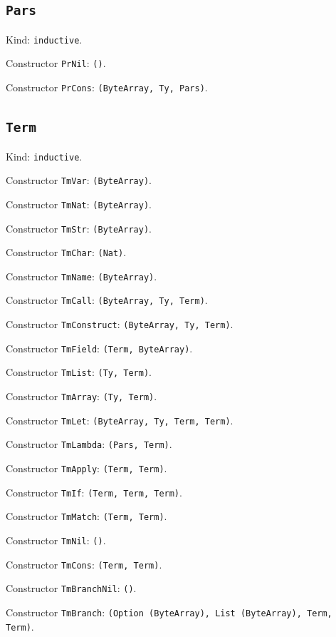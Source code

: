\documentclass[11pt]{article}
\begin{document}
\subsection*{\texttt{Pars}}
\noindent Kind: \texttt{inductive}.\par
\noindent Constructor \texttt{PrNil}: \texttt{()}.\par
\noindent Constructor \texttt{PrCons}: \texttt{(ByteArray, Ty, Pars)}.\par
\subsection*{\texttt{Term}}
\noindent Kind: \texttt{inductive}.\par
\noindent Constructor \texttt{TmVar}: \texttt{(ByteArray)}.\par
\noindent Constructor \texttt{TmNat}: \texttt{(ByteArray)}.\par
\noindent Constructor \texttt{TmStr}: \texttt{(ByteArray)}.\par
\noindent Constructor \texttt{TmChar}: \texttt{(Nat)}.\par
\noindent Constructor \texttt{TmName}: \texttt{(ByteArray)}.\par
\noindent Constructor \texttt{TmCall}: \texttt{(ByteArray, Ty, Term)}.\par
\noindent Constructor \texttt{TmConstruct}: \texttt{(ByteArray, Ty, Term)}.\par
\noindent Constructor \texttt{TmField}: \texttt{(Term, ByteArray)}.\par
\noindent Constructor \texttt{TmList}: \texttt{(Ty, Term)}.\par
\noindent Constructor \texttt{TmArray}: \texttt{(Ty, Term)}.\par
\noindent Constructor \texttt{TmLet}: \texttt{(ByteArray, Ty, Term, Term)}.\par
\noindent Constructor \texttt{TmLambda}: \texttt{(Pars, Term)}.\par
\noindent Constructor \texttt{TmApply}: \texttt{(Term, Term)}.\par
\noindent Constructor \texttt{TmIf}: \texttt{(Term, Term, Term)}.\par
\noindent Constructor \texttt{TmMatch}: \texttt{(Term, Term)}.\par
\noindent Constructor \texttt{TmNil}: \texttt{()}.\par
\noindent Constructor \texttt{TmCons}: \texttt{(Term, Term)}.\par
\noindent Constructor \texttt{TmBranchNil}: \texttt{()}.\par
\noindent Constructor \texttt{TmBranch}: \texttt{(Option (ByteArray), List (ByteArray), Term, Term)}.\par
\end{document}
